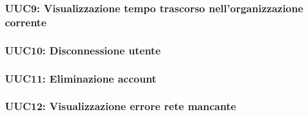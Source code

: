 \documentclass[../analisi-dei-requisiti.tex]{subfiles}
\begin{document}


\subsubsection{UUC9: Visualizzazione tempo trascorso nell'organizzazione corrente}%
\label{subs:UUC9}



\subsubsection{UUC10: Disconnessione utente}%
\label{subs:UU10}



\subsubsection{UUC11: Eliminazione account}%
\label{subs:UUC11}



\subsubsection{UUC12: Visualizzazione errore rete mancante}%
\label{subs:UUC12}


\end{document}
